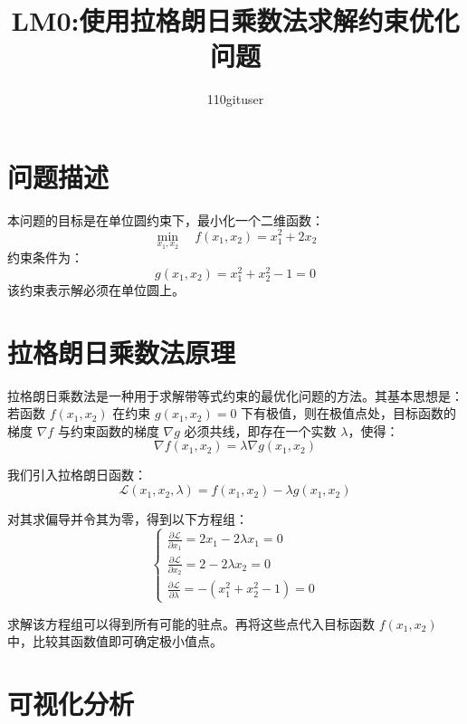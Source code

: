 \documentclass[12pt]{ctexart}
\title{LM0:使用拉格朗日乘数法求解约束优化问题}
\author{110gituser}
\date{}
\begin{document}
\maketitle

\section{问题描述}

本问题的目标是在单位圆约束下，最小化一个二维函数：
\[
\min_{x_1, x_2} \quad f(x_1, x_2) = x_1^2 + 2x_2
\]
约束条件为：
\[
g(x_1, x_2) = x_1^2 + x_2^2 - 1 = 0
\]
该约束表示解必须在单位圆上。

\section{拉格朗日乘数法原理}

拉格朗日乘数法是一种用于求解带等式约束的最优化问题的方法。其基本思想是：若函数 \( f(x_1, x_2) \) 在约束 \( g(x_1, x_2) = 0 \) 下有极值，则在极值点处，目标函数的梯度 \( \nabla f \) 与约束函数的梯度 \( \nabla g \) 必须共线，即存在一个实数 \( \lambda \)，使得：
\[
\nabla f(x_1, x_2) = \lambda \nabla g(x_1, x_2)
\]

我们引入拉格朗日函数：
\[
\mathcal{L}(x_1, x_2, \lambda) = f(x_1, x_2) - \lambda g(x_1, x_2)
\]

对其求偏导并令其为零，得到以下方程组：
\[
\begin{cases}
\frac{\partial \mathcal{L}}{\partial x_1} = 2x_1 - 2\lambda x_1 = 0 \\
\frac{\partial \mathcal{L}}{\partial x_2} = 2 - 2\lambda x_2 = 0 \\
\frac{\partial \mathcal{L}}{\partial \lambda} = - (x_1^2 + x_2^2 - 1) = 0
\end{cases}
\]

求解该方程组可以得到所有可能的驻点。再将这些点代入目标函数 \( f(x_1, x_2) \) 中，比较其函数值即可确定极小值点。

\section{可视化分析}
\end{document}
